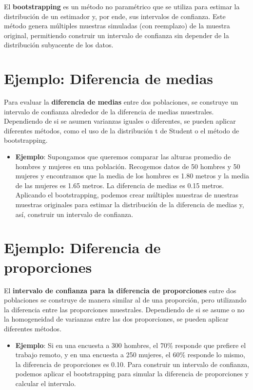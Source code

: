 \documentclass[
  letterpaper,
  DIV=11,
  numbers=noendperiod]{scrreprt}
\providecommand{\tightlist}{%
  \setlength{\itemsep}{0pt}\setlength{\parskip}{0pt}}\usepackage{longtable,booktabs,array}
\begin{document}
El \textbf{bootstrapping} es un método no paramétrico que se utiliza
para estimar la distribución de un estimador y, por ende, sus intervalos
de confianza. Este método genera múltiples muestras simuladas (con
reemplazo) de la muestra original, permitiendo construir un intervalo de
confianza sin depender de la distribución subyacente de los datos.

\section{Ejemplo: Diferencia de
medias}\label{ejemplo-diferencia-de-medias}

Para evaluar la \textbf{diferencia de medias} entre dos poblaciones, se
construye un intervalo de confianza alrededor de la diferencia de medias
muestrales. Dependiendo de si se asumen varianzas iguales o diferentes,
se pueden aplicar diferentes métodos, como el uso de la distribución t
de Student o el método de bootstrapping.

\begin{itemize}
\tightlist
\item
  \textbf{Ejemplo}: Supongamos que queremos comparar las alturas
  promedio de hombres y mujeres en una población. Recogemos datos de 50
  hombres y 50 mujeres y encontramos que la media de los hombres es 1.80
  metros y la media de las mujeres es 1.65 metros. La diferencia de
  medias es 0.15 metros. Aplicando el bootstrapping, podemos crear
  múltiples muestras de nuestras muestras originales para estimar la
  distribución de la diferencia de medias y, así, construir un intervalo
  de confianza.
\end{itemize}

\section{Ejemplo: Diferencia de
proporciones}\label{ejemplo-diferencia-de-proporciones}

El \textbf{intervalo de confianza para la diferencia de proporciones}
entre dos poblaciones se construye de manera similar al de una
proporción, pero utilizando la diferencia entre las proporciones
muestrales. Dependiendo de si se asume o no la homogeneidad de varianzas
entre las dos proporciones, se pueden aplicar diferentes métodos.

\begin{itemize}
\tightlist
\item
  \textbf{Ejemplo}: Si en una encuesta a 300 hombres, el 70\% responde
  que prefiere el trabajo remoto, y en una encuesta a 250 mujeres, el
  60\% responde lo mismo, la diferencia de proporciones es 0.10. Para
  construir un intervalo de confianza, podemos aplicar el bootstrapping
  para simular la diferencia de proporciones y calcular el intervalo.
\end{itemize}
\end{document}
